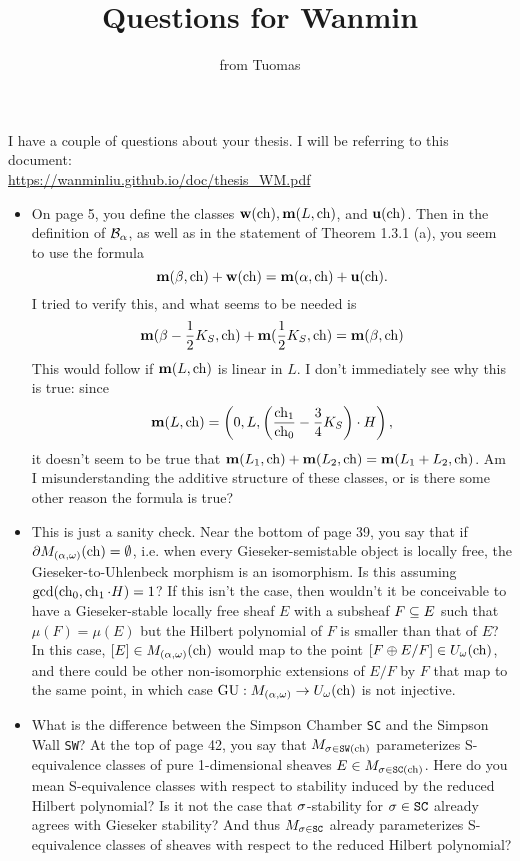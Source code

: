 \documentclass[letterpaper,10pt]{article}
\title{Questions for Wanmin}
\author{from Tuomas}
\date{}
\theoremstyle{remark}
\begin{document}
\maketitle

\noindent I have a couple of questions about your thesis. I will be referring to this document:\\ \url{https://wanminliu.github.io/doc/thesis_WM.pdf}
\begin{itemize}
    \item On page 5, you define the classes $\mathbf{w}(\operatorname{\mathrm{ch}}), \mathbf{m}(L, \operatorname{\mathrm{ch}})$, and $\mathbf{u}(\operatorname{\mathrm{ch}})$. Then in the definition of $
    \mathcal{B}_\alpha$, as well as in the statement of Theorem 1.3.1 (a), you seem to use the formula
    \[ \mathbf{m}(\beta, \operatorname{\mathrm{ch}}) + \mathbf{w}(\operatorname{\mathrm{ch}}) = \mathbf{m}(\alpha, \operatorname{\mathrm{ch}}) + \mathbf{u}(\operatorname{\mathrm{ch}}). \]
    I tried to verify this, and what seems to be needed is 
    \[ \mathbf{m}(\beta - \frac{1}{2} K_S, \operatorname{\mathrm{ch}}) + \mathbf{m}(\frac{1}{2} K_S, \operatorname{\mathrm{ch}}) = \mathbf{m}(\beta, \operatorname{\mathrm{ch}}) \] 
    This would follow if $\mathbf{m}(L, \operatorname{\mathrm{ch}})$ is linear in $L$. I don't immediately see why this is true: since
    \[ \mathbf{m}(L, \operatorname{\mathrm{ch}}) = \left(0, L, \left(\frac{\operatorname{\mathrm{ch}}_1}{\operatorname{\mathrm{ch}}_0} - \frac{3}{4} K_S\right)\cdot H \right), \]
    it doesn't seem to be true that $\mathbf{m}(L_1, \operatorname{\mathrm{ch}}) + \mathbf{m}(L_2, \operatorname{\mathrm{ch}}) = \mathbf{m}(L_1 + L_2, \operatorname{\mathrm{ch}})$. Am I misunderstanding the additive structure of these classes, or is there some other reason the formula is true?
    
    \item This is just a sanity check. Near the bottom of page 39, you say that if $\partial M_{(\alpha, \omega)}(\operatorname{\mathrm{ch}}) = \emptyset$, i.e. when every Gieseker-semistable object is locally free, the Gieseker-to-Uhlenbeck morphism is an isomorphism. Is this assuming $\gcd(\operatorname{\mathrm{ch}}_0, \operatorname{\mathrm{ch}}_1 \cdot H) = 1$? If this isn't the case, then wouldn't it be conceivable to have a Gieseker-stable locally free sheaf $E$ with a subsheaf $F \subseteq E$ such that $\mu(F) = \mu(E)$ but the Hilbert polynomial of $F$ is smaller than that of $E$? In this case, $[E] \in M_{(\alpha,\omega)}(\operatorname{\mathrm{ch}})$ would map to the point $[F \oplus E/F] \in U_\omega(\operatorname{\mathrm{ch}})$, and there could be other non-isomorphic extensions of $E/F$ by $F$ that map to the same point, in which case $\mathrm{GU}: M_{(\alpha,\omega)} \to U_\omega(\operatorname{\mathrm{ch}})$ is not injective.
    
    \item What is the difference between the Simpson Chamber \texttt{SC} and the Simpson Wall \texttt{SW}? At the top of page 42, you say that $M_{\sigma \in \texttt{SW}(\operatorname{\mathrm{ch}})}$ parameterizes S-equivalence classes of pure 1-dimensional sheaves $E \in M_{\sigma \in \texttt{SC}(\operatorname{\mathrm{ch}})}$. Here do you mean S-equivalence classes with respect to stability induced by the reduced Hilbert polynomial? Is it not the case that $\sigma$-stability for $\sigma \in \texttt{SC}$ already agrees with Gieseker stability? And thus $M_{\sigma \in \texttt{SC}}$ already parameterizes S-equivalence classes of sheaves with respect to the reduced Hilbert polynomial?
\end{itemize}
\end{document}
